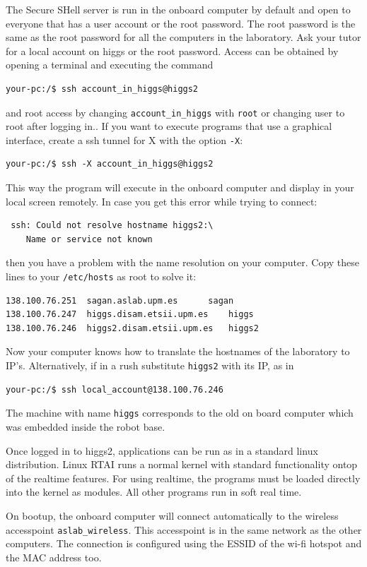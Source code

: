 The Secure SHell server is run in the onboard computer by default and open to everyone that has a user account
or the root password. The root password is the same as the root password for all the computers in the laboratory.
Ask your tutor for a local account on higgs or the root password. Access can be obtained by opening a terminal
and executing the command
\begin{verbatim}
your-pc:/$ ssh account_in_higgs@higgs2
\end{verbatim} 
and root access by changing \texttt{account\_in\_higgs} with \texttt{root} or changing user to root after logging in..
If you want to execute programs that use a graphical interface, create a ssh tunnel for X with the option \texttt{-X}:
\begin{verbatim}
your-pc:/$ ssh -X account_in_higgs@higgs2
\end{verbatim}
This way the program will execute in the onboard computer and display in your local screen remotely.
In case you get this error while trying to connect:
\begin{verbatim}
 ssh: Could not resolve hostname higgs2:\
	Name or service not known
\end{verbatim}
then you have a problem with the name resolution on your computer. Copy these lines to your \texttt{/etc/hosts}
as root to solve it:
\begin{verbatim}
138.100.76.251  sagan.aslab.upm.es		sagan
138.100.76.247	higgs.disam.etsii.upm.es	higgs
138.100.76.246	higgs2.disam.etsii.upm.es	higgs2
\end{verbatim}
Now your computer knows how to translate the hostnames of the laboratory to IP's.
Alternatively, if in a rush substitute \texttt{higgs2} with its IP, as in
\begin{verbatim}
your-pc:/$ ssh local_account@138.100.76.246
\end{verbatim} 

The machine with name \texttt{higgs} corresponds to the old on board computer which was embedded inside the robot base.

Once logged in to higgs2, applications can be run as in a standard linux distribution.
Linux RTAI runs a normal kernel with standard functionality ontop of the realtime features.
For using realtime, the programs must be loaded directly into the kernel as modules. All other programs 
run in soft real time.

On bootup, the onboard computer will connect automatically to the wireless
accesspoint \texttt{aslab\_wireless}.
This accesspoint is in the same network as the  other computers. The connection is configured using the ESSID of the wi-fi hotspot and the MAC address too.


